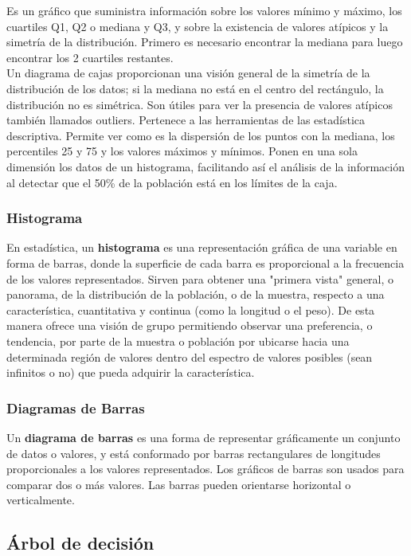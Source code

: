 \documentclass[osajnl,twocolumn,showpacs,superscriptaddress,10pt,floatfix]{revtex4-1} %
\begin{document}
Es un gráfico que suministra información sobre los valores mínimo y máximo, los cuartiles Q1, Q2 o mediana y Q3, y sobre la existencia de valores atípicos y la simetría de la distribución. Primero es necesario encontrar la mediana para luego encontrar los 2 cuartiles restantes. \\

Un diagrama de cajas proporcionan una visión general de la simetría de la distribución de los datos; si la mediana no está en el centro del rectángulo, la distribución no es simétrica. Son útiles para ver la presencia de valores atípicos también llamados outliers. Pertenece a las herramientas de las estadística descriptiva. Permite ver como es la dispersión de los puntos con la mediana, los percentiles 25 y 75 y los valores máximos y mínimos. Ponen en una sola dimensión los datos de un histograma, facilitando así el análisis de la información al detectar que el 50\% de la población está en los límites de la caja.

\subsubsection{Histograma}

En estadística, un \textbf{histograma} es una representación gráfica de una variable en forma de barras, donde la superficie de cada barra es proporcional a la frecuencia de los valores representados. Sirven para obtener una "primera vista" general, o panorama, de la distribución de la población, o de la muestra, respecto a una característica, cuantitativa y continua (como la longitud o el peso). De esta manera ofrece una visión de grupo permitiendo observar una preferencia, o tendencia, por parte de la muestra o población por ubicarse hacia una determinada región de valores dentro del espectro de valores posibles (sean infinitos o no) que pueda adquirir la característica.

\subsubsection{Diagramas de Barras}

Un \textbf{diagrama de barras} es una forma de representar gráficamente un conjunto de datos o valores, y está conformado por barras rectangulares de longitudes proporcionales a los valores representados. Los gráficos de barras son usados para comparar dos o más valores. Las barras pueden orientarse horizontal o verticalmente.

\subsection{Árbol de decisión}
\end{document}
